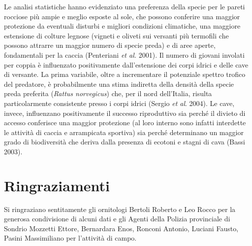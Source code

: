 Le analisi statistiche hanno evidenziato una preferenza della specie per
le pareti rocciose pi\`u ampie e meglio esposte al sole, che possono
conferire una maggior protezione da eventuali disturbi e migliori
condizioni climatiche, una maggiore estensione di colture legnose
(vigneti e oliveti sui versanti pi\`u termofili che possono attrarre un
maggior numero di specie preda) e di aree aperte, fondamentali per la
caccia (Penteriani \textit{et al. }2001). Il numero di giovani involati
per coppia \`e influenzato positivamente
dall{\textquoteright}estensione dei corpi idrici e delle cave di
versante. La prima variabile, oltre a incrementare il potenziale
spettro trofico del predatore, \`e probabilmente una stima indiretta
della densit\`a della specie preda preferita (\textit{Rattus
norvegicus}) che, per il nord dell{\textquoteright}Italia, risulta
particolarmente consistente presso i corpi idrici (Sergio \textit{et
al}. 2004). Le cave, invece, influenzano positivamente il successo
riproduttivo sia perch\'e il divieto di accesso conferisce una maggior
protezione (al loro interno sono infatti interdette le attivit\`a di
caccia e arrampicata sportiva) sia perch\'e determinano un maggior
grado di biodiversit\`a che deriva dalla presenza di ecotoni e stagni
di cava (Bassi 2003). 

\section*{Ringraziamenti}

Si ringraziano sentitamente gli ornitologi Bertoli Roberto e Leo Rocco
per la generosa condivisione di alcuni dati e gli Agenti della Polizia
provinciale di Sondrio Mozzetti Ettore, Bernardara Enos, Ronconi
Antonio, Luciani Fausto, Pasini Massimiliano per
l{\textquoteright}attivit\`a di campo.

